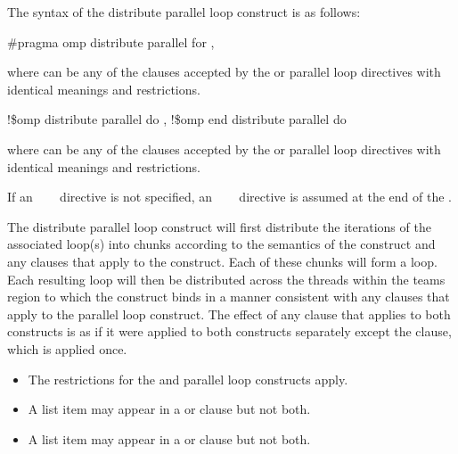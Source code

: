 \syntax
The syntax of the distribute parallel loop construct is as follows:

\ccppspecificstart
\begin{boxedcode}
\#pragma omp distribute parallel for \plc{[clause[ [},\plc{] clause] ... ]}
\end{boxedcode}

where  can be any of the clauses accepted by the  or parallel loop 
directives with identical meanings and restrictions.
\ccppspecificend

\fortranspecificstart
\begin{boxedcode}
!\$omp distribute parallel do \plc{[clause[ [},\plc{] clause] ... ]}
\plc{[}!\$omp end distribute parallel do\plc{]}
\end{boxedcode}

where  can be any of the clauses accepted by the  or parallel loop 
directives with identical meanings and restrictions.

If an ~~~ directive is not specified, an 
~~~ directive is assumed at the end of the .
\fortranspecificend

\descr
The distribute parallel loop construct will first distribute the iterations of the associated loop(s) into chunks according to the semantics of the  construct and any clauses that apply to the  construct. Each of these chunks will form a loop. Each resulting loop will then be distributed across the threads within the teams region to which the  construct binds in a manner consistent with any clauses that apply to the parallel loop construct. 
The effect of any clause that applies to both constructs is as if it were applied to both constructs separately except the  clause, which is applied once.

\restrictions
\begin{itemize}
\item The restrictions for the  and parallel loop constructs apply.
\item A list item may appear in a  or  clause but not both.
\item A list item may appear in a  or  clause but not both.
\end{itemize}

